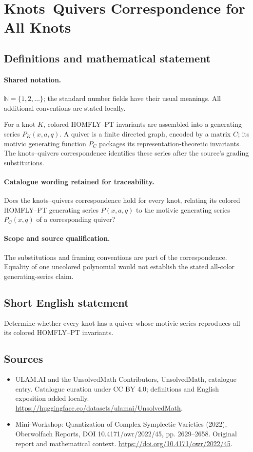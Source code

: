 \documentclass[11pt]{article}
\begin{document}
\section{Knots–Quivers Correspondence for All Knots}\label{statement}

\subsection{Definitions and mathematical statement}

\paragraph{Shared notation.}$\mathbb N=\{1,2,\ldots\}$; the standard number fields have their usual meanings. All additional conventions are stated locally.


For a knot $K$, colored HOMFLY--PT invariants are assembled into a generating series $P_K(x,a,q)$. A quiver is a finite directed graph, encoded by a matrix $C$; its motivic generating function $P_C$ packages its representation-theoretic invariants. The knots--quivers correspondence identifies these series after the source's grading substitutions.

\paragraph{Catalogue wording retained for traceability.}
Does the knots–quivers correspondence hold for every knot, relating its colored HOMFLY–PT generating series $P(x,a,q)$ to the motivic generating series $P_C(x,q)$ of a corresponding quiver?

\paragraph{Scope and source qualification.}The substitutions and framing conventions are part of the correspondence. Equality of one uncolored polynomial would not establish the stated all-color generating-series claim.
\subsection{Short English statement}
Determine whether every knot has a quiver whose motivic series reproduces all its colored HOMFLY--PT invariants.
\subsection{Sources}
\begin{itemize}
\item[\hypertarget{source:statement:1}{S1}] ULAM.AI and the UnsolvedMath Contributors, UnsolvedMath, catalogue entry. Catalogue curation under CC BY 4.0; definitions and English exposition added locally.
\url{https://huggingface.co/datasets/ulamai/UnsolvedMath}.
\item[\hypertarget{source:statement:2}{S2}] Mini-Workshop: Quantization of Complex Symplectic Varieties (2022), Oberwolfach Reports, DOI 10.4171/owr/2022/45, pp. 2629--2658. Original report and mathematical context.
\url{https://doi.org/10.4171/owr/2022/45}.
\end{itemize}
\label{end:statement}
\end{document}
